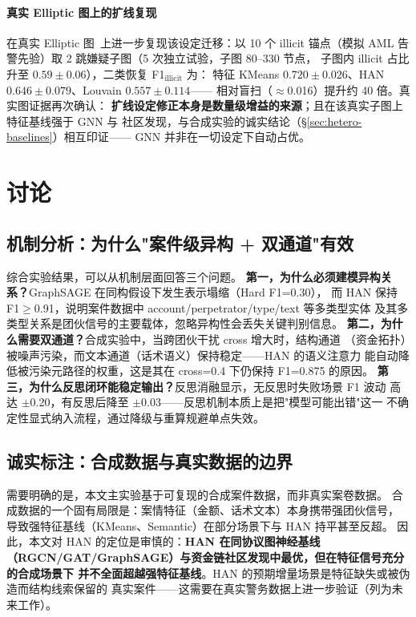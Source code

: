 \documentclass[12pt,a4paper,fontset=windows]{ctexart}
\begin{document}
\paragraph{真实 Elliptic 图上的扩线复现}
在真实 Elliptic 图~\cite{weber2019elliptic}上进一步复现该设定迁移：以 10 个
illicit 锚点（模拟 AML 告警先验）取 2 跳嫌疑子图（5 次独立试验，子图 80--330 节点，
子图内 illicit 占比升至 $0.59\pm0.06$），二类恢复 F1$_{\text{illicit}}$ 为：
特征 KMeans $0.720\pm0.026$、HAN $0.646\pm0.079$、Louvain $0.557\pm0.114$——
相对盲扫（$\approx$0.016）提升约 40 倍。真实图证据再次确认：
\textbf{扩线设定修正本身是数量级增益的来源}；且在该真实子图上特征基线强于 GNN 与
社区发现，与合成实验的诚实结论（§\ref{sec:hetero-baselines}）相互印证——
GNN 并非在一切设定下自动占优。

\section{讨论}

\subsection{机制分析：为什么"案件级异构 + 双通道"有效}

综合实验结果，可以从机制层面回答三个问题。
\textbf{第一，为什么必须建模异构关系？}GraphSAGE 在同构假设下发生表示塌缩（Hard F1=0.30），
而 HAN 保持 F1$\ge$0.91，说明案件数据中 account/perpetrator/type/text 等多类型实体
及其多类型关系是团伙信号的主要载体，忽略异构性会丢失关键判别信息。
\textbf{第二，为什么需要双通道？}合成实验中，当跨团伙干扰 cross 增大时，结构通道
（资金拓扑）被噪声污染，而文本通道（话术语义）保持稳定——HAN 的语义注意力
能自动降低被污染元路径的权重，这是其在 cross=0.4 下仍保持 F1=0.875 的原因。
\textbf{第三，为什么反思闭环能稳定输出？}反思消融显示，无反思时失败场景 F1 波动
高达 $\pm$0.20，有反思后降至 $\pm$0.03——反思机制本质上是把"模型可能出错"这一
不确定性显式纳入流程，通过降级与重算规避单点失效。

\subsection{诚实标注：合成数据与真实数据的边界}

需要明确的是，本文主实验基于可复现的合成案件数据，而非真实案卷数据。
合成数据的一个固有局限是：案情特征（金额、话术文本）本身携带强团伙信号，
导致强特征基线（KMeans、Semantic）在部分场景下与 HAN 持平甚至反超。
因此，本文对 HAN 的定位是审慎的：\textbf{HAN 在同协议图神经基线
（RGCN/GAT/GraphSAGE）与资金链社区发现中最优，但在特征信号充分的合成场景下
并不全面超越强特征基线}。HAN 的预期增量场景是特征缺失或被伪造而结构线索保留的
真实案件——这需要在真实警务数据上进一步验证（列为未来工作）。
\end{document}
